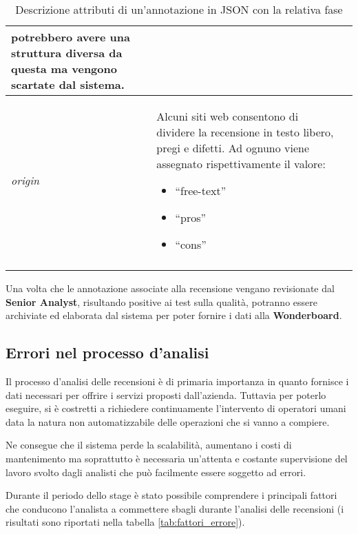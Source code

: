 \begin{center}
\begin{longtable}{|>{\centering}p{2.2cm}|p{8cm}|>{\centering}p{2.5cm}|}
potrebbero avere una struttura diversa da questa ma vengono scartate dal 
sistema. &
\nameref{salvarla} \tabularnewline\hline
\textit{origin} &
Alcuni siti web consentono di dividere la recensione in testo libero, pregi e 
difetti. Ad ognuno viene assegnato rispettivamente il valore:
\begin{itemize}
\item ``free-text''
\item ``pros''
\item ``cons''
\end{itemize}
&
\nameref{evidenziarla} \tabularnewline \hline
\caption{Descrizione attributi di un'annotazione in JSON con la relativa fase}
\label{tab:attributi_annotazione}
\end{longtable}
\end{center}

Una volta che le annotazione associate alla recensione vengano revisionate
dal \textbf{Senior Analyst}, risultando positive ai test sulla qualità, potranno
essere archiviate ed elaborata dal sistema per poter fornire i dati alla
\textbf{Wonderboard}. 

\subsection{Errori nel processo d'analisi}
Il processo d'analisi delle recensioni è di primaria importanza in quanto
fornisce i dati necessari per offrire i servizi proposti dall'azienda.
Tuttavia per poterlo eseguire, si è costretti a richiedere continuamente
l'intervento di operatori umani data la natura non automatizzabile delle
operazioni che si vanno a compiere.

Ne consegue che il sistema perde la scalabilità, aumentano i costi di mantenimento
ma soprattutto è necessaria un'attenta e costante supervisione del lavoro svolto
dagli analisti che può facilmente essere soggetto ad errori.

Durante il periodo dello stage è stato possibile comprendere i principali
fattori che conducono l'analista a commettere sbagli durante l'analisi delle
recensioni (i risultati sono riportati nella tabella \ref{tab:fattori_errore}).

